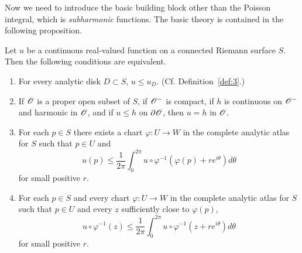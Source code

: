 \documentclass[a4paper,11pt]{article}
\begin{document}
Now we need to introduce the basic building block other than the
Poisson integral, which is \emph{subharmonic} functions.  The basic
theory is contained in the following proposition.

\begin{propn}
  \label{propn:10}
  Let $u$ be a continuous real-valued function on a connected Riemann
  surface $S$.  Then the following conditions are equivalent.
  \begin{enumerate}
  \item For every analytic disk $D \subset S$, $u \le u_D$.
    (Cf. Definition~\ref{def:3}.)
  \item If ${\mathscr{O}}$ is a proper open subset of $S$, if ${\mathscr{O}}^-$ is
    compact, if $h$ is continuous on ${\mathscr{O}}^-$ and harmonic in ${\mathscr{O}}$,
    and if $u \le h$ on $\partial {\mathscr{O}}$, then $u = h$ in ${\mathscr{O}}$.
  \item For each $p \in S$ there exists a chart $\varphi : U \to W$ in
    the complete analytic atlas for $S$ such that $p \in U$ and
    $$
    u(p) \le \frac{1}{2\pi} \int_0^{2\pi} u \circ \varphi^{-1}(
    \varphi(p) + re^{i\theta}) d \theta
    $$
    for small positive $r$.
  \item For each $p \in S$ and every chart $\varphi : U \to W$ in the
    complete analytic atlas for $S$ such that $p \in U$ and every $z$
    sufficiently close to $\varphi(p)$,
    $$
    u \circ \varphi^{-1}(z) \le \frac{1}{2\pi} \int_0^{2\pi}
    u \circ \varphi^{-1}(z + re^{i\theta}) d\theta
    $$
    for small positive $r$.
  \end{enumerate}
\end{propn}
\end{document}

